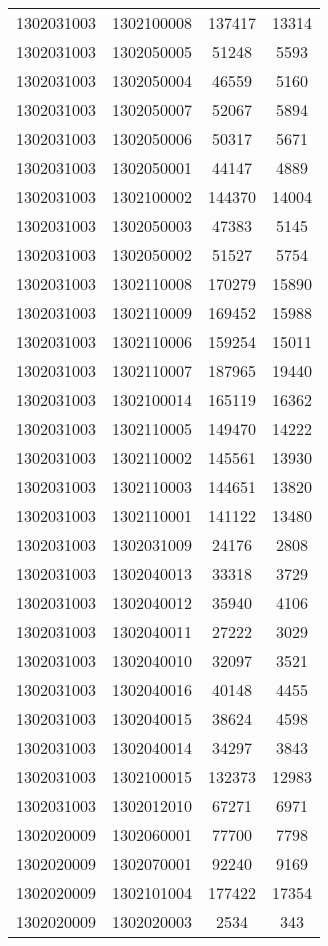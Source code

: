 \begin{longtable}{llcc}
1302031003 & 1302100008 & 137417 & 13314\\
1302031003 & 1302050005 & 51248 & 5593\\
1302031003 & 1302050004 & 46559 & 5160\\
1302031003 & 1302050007 & 52067 & 5894\\
1302031003 & 1302050006 & 50317 & 5671\\
1302031003 & 1302050001 & 44147 & 4889\\
1302031003 & 1302100002 & 144370 & 14004\\
1302031003 & 1302050003 & 47383 & 5145\\
1302031003 & 1302050002 & 51527 & 5754\\
1302031003 & 1302110008 & 170279 & 15890\\
1302031003 & 1302110009 & 169452 & 15988\\
1302031003 & 1302110006 & 159254 & 15011\\
1302031003 & 1302110007 & 187965 & 19440\\
1302031003 & 1302100014 & 165119 & 16362\\
1302031003 & 1302110005 & 149470 & 14222\\
1302031003 & 1302110002 & 145561 & 13930\\
1302031003 & 1302110003 & 144651 & 13820\\
1302031003 & 1302110001 & 141122 & 13480\\
1302031003 & 1302031009 & 24176 & 2808\\
1302031003 & 1302040013 & 33318 & 3729\\
1302031003 & 1302040012 & 35940 & 4106\\
1302031003 & 1302040011 & 27222 & 3029\\
1302031003 & 1302040010 & 32097 & 3521\\
1302031003 & 1302040016 & 40148 & 4455\\
1302031003 & 1302040015 & 38624 & 4598\\
1302031003 & 1302040014 & 34297 & 3843\\
1302031003 & 1302100015 & 132373 & 12983\\
1302031003 & 1302012010 & 67271 & 6971\\
1302020009 & 1302060001 & 77700 & 7798\\
1302020009 & 1302070001 & 92240 & 9169\\
1302020009 & 1302101004 & 177422 & 17354\\
1302020009 & 1302020003 & 2534 & 343\\

\end{longtable}
